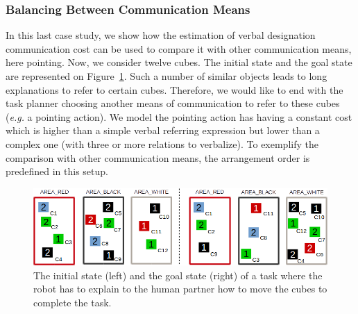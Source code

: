 \documentclass[a4paper,11pt,twoside]{StyleThese}
\begin{document}
\subsubsection{Balancing Between Communication Means}

In this last case study, we show how the estimation of verbal designation communication cost can be used to compare it with other communication means, here pointing. Now, we consider twelve cubes. The initial state and the goal state are represented on Figure~\ref{fig:case3}. Such a number of similar objects leads to long explanations to refer to certain cubes. Therefore, we would like to end with the task planner choosing another means of communication to refer to these cubes (\textit{e.g.} a pointing action). We model the pointing action has having a constant cost which is higher than a simple verbal referring expression but lower than a complex one (with three or more relations to verbalize). To exemplify the comparison with other communication means, the arrangement order is predefined in this setup. %

\begin{figure}[t!]
\centering
\includegraphics[scale=0.5]{figures/chapter3/case3.png}
\caption{\label{fig:case3} The initial state (left) and the goal state (right) of a task where the robot has to explain to the human partner how to move the cubes to complete the task. }
\end{figure}

\end{document}
